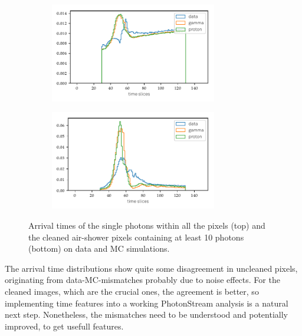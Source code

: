 \begin{figure}
  \begin{subfigure}{\textwidth}
    \centering
    \includegraphics[width=0.8\textwidth]{Plots/all_slices_min_0_per_pixel.pdf}
  \end{subfigure}
  \begin{subfigure}{\textwidth}
    \centering
    \includegraphics[width=0.8\textwidth]{Plots/all_slices_min_10_per_pixel.pdf}
  \end{subfigure}
  \caption{Arrival times of the single photons within all the pixels (top) and the cleaned air-shower pixels containing at least 10 photons (bottom) on data and MC simulations.}
  \label{fig:slices}
\end{figure}
%

The arrival time distributions show quite some disagreement in uncleaned
pixels, originating from data-MC-mismatches probably due to noise effects. For
the cleaned images, which are the crucial ones, the agreement is better, so
implementing time features into a working PhotonStream analysis is a natural
next step. Nonetheless, the mismatches need to be understood and potentially
improved, to get usefull features.

